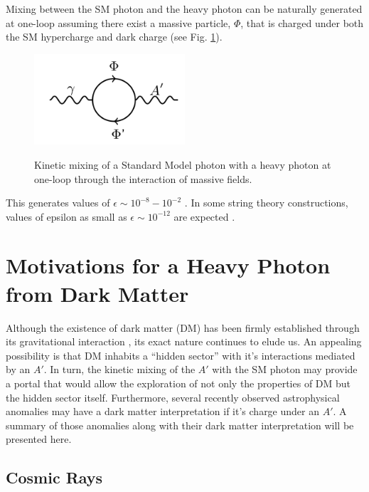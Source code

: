 Mixing between the SM photon and the heavy photon can be naturally
generated at one-loop assuming there exist a massive particle, $\Phi$, that is charged
under both the SM hypercharge and dark charge (see Fig. \ref{fig:aprime_loop}).
\begin{figure}
    \centering
    \includegraphics[width=0.5\textwidth]{images/aprime_loop.png}
    \label{fig:aprime_loop}
    \caption{Kinetic mixing of a Standard Model photon with a heavy photon 
    at one-loop through the interaction of massive fields.}
\end{figure}
This generates values of $\epsilon \sim 10^{-8} - 10^{-2}$ 
\cite{arkani-hamed2008, bjorken2009}.  In some string theory constructions, 
values of epsilon as small as $\epsilon \sim 10^{-12}$ are expected \cite{}.

%
%

\section{Motivations for a Heavy Photon from Dark Matter}

Although the existence of dark matter (DM) has been firmly established through its
gravitational interaction \cite{popolo2014}, its exact nature continues to elude
us. An appealing
possibility is that DM inhabits a ``hidden sector'' with it's interactions 
mediated by an $A'$.  In turn, the kinetic mixing of the $A'$ with the SM 
photon may provide a portal that would allow the exploration of not only the 
properties of DM but the hidden sector itself.  Furthermore, several recently
observed astrophysical anomalies \cite{pamela2008, ackermann2012, aguilar2013}
may have a dark matter interpretation if it's
charge under an $A'$.  A summary of those anomalies along with their dark matter
interpretation will be presented here.

\subsection{Cosmic Rays}


